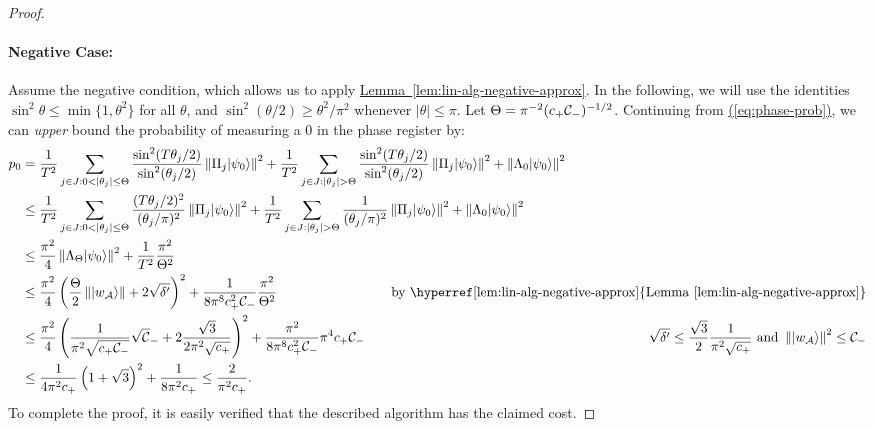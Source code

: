 \documentclass{theoretics}
\newcommand{\eq}[1]{\hyperref[eq:#1]{(\ref*{eq:#1})}}
\newcommand{\lem}[1]{\hyperref[lem:#1]{Lemma~\ref*{lem:#1}}}
\def\ket#1{{\lvert}#1\rangle}
\renewcommand{\>}{\rangle}
\newcommand{\<}{\langle}
\renewcommand{\(}{\left(}
\renewcommand{\)}{\right)}
\def\norm#1{\left\| #1 \right\|}
\begin{document}
\begin{proof}
\paragraph{Negative Case:} Assume the negative condition, which allows us to apply \lem{lin-alg-negative-approx}. In the following, we will use the identities $\sin^2\theta\leq \min\{1,\theta^2\}$ for all $\theta$, and $\sin^2(\theta/2)\geq \theta^2/\pi^2$ whenever $|\theta|\leq \pi$. Let $\Theta = {\pi^{-2}({c_+{\cal C}_-})^{-1/2}}$.
Continuing from \eq{phase-prob}, 
we can \emph{upper} bound the probability of measuring a 0 in the phase register by:
\begin{align*}
p_0
&=\frac{1}{T^2}\sum_{j\in J:0<|\theta_j|\leq \Theta}\frac{\sin^2(T\theta_j/2)}{\sin^2(\theta_j/2)}\norm{\Pi_j\ket{\psi_0}}^2
+\frac{1}{T^2}\sum_{j\in J:|\theta_j|> \Theta}\frac{\sin^2(T\theta_j/2)}{\sin^2(\theta_j/2)}\norm{\Pi_j\ket{\psi_0}}^2+\norm{\Lambda_0\ket{\psi_0}}^2\!\!\!\!\!\!\!\!\!\!\!\!\!\!\!\!\!\!\!\!\!\!\!\!\!\!\!\!\!\!\!\!\!\!\!\!\!\!\!\!\!\!\!\!\!\!\!\!\!\!\!\!\!\!\!\!\!\!\!\!\!\!\!\!\!\!\!\!\!\!\!\!\!\!\!\!\!\!\!\!\!\!\!\!\\
&\leq \frac{1}{T^2}\sum_{j\in J:0<|\theta_j|\leq \Theta}\frac{(T\theta_j/2)^2}{(\theta_j/\pi)^2}\norm{\Pi_j\ket{\psi_0}}^2+\frac{1}{T^2}\sum_{j\in J:|\theta_j|>\Theta}\frac{1}{(\theta_j/\pi)^2}\norm{\Pi_j\ket{\psi_0}}^2+\norm{\Lambda_0\ket{\psi_0}}^2\!\!\!\!\!\!\!\!\!\!\!\!\!\!\!\!\!\!\!\!\!\!\!\!\!\!\!\!\!\!\!\!\!\!\!\!\!\!\!\!\!\!\!\!\!\!\!\!\!\!\!\!\!\!\!\!\!\!\!\!\!\!\!\!\!\!\!\!\!\!\!\!\!\!\\
&\leq \frac{\pi^2}{4}\norm{\Lambda_\Theta\ket{\psi_0}}^2+\frac{1}{T^2}\frac{\pi^2}{\Theta^2}\\
&\leq \frac{\pi^2}{4}\left(\frac{\Theta}{2}\norm{\ket{w_{\cal A}}}+2\sqrt{\delta'}\right)^2+\frac{1}{8\pi^8c_+^2{\cal C}_-}\frac{\pi^2}{\Theta^2} & \mbox{by \lem{lin-alg-negative-approx}}\\
&\leq \frac{\pi^2}{4}\left(\frac{1}{\pi^2\sqrt{c_+{\cal C}_-}}\sqrt{\cal C}_-+2\frac{\sqrt{3}}{2\pi^2\sqrt{c_+}}\right)^2 + \frac{\pi^2}{8\pi^8c_+^2{\cal C}_-}\pi^4 c_+{\cal C}_- & \sqrt{\delta'}\leq \frac{\sqrt{3}}{2}\frac{1}{\pi^2\sqrt{c_+}}\mbox{ and } \norm{\ket{w_{\cal A}}}^2\leq {\cal C}_-\\
&\leq \frac{1}{4\pi^2c_+}\left(1+\sqrt{3}\right)^2 + \frac{1}{8\pi^2c_+}
 \leq \frac{2}{\pi^2c_+}.
\end{align*}
To complete the proof, it is easily verified that the described algorithm has the claimed cost.
\end{proof}
\end{document}
